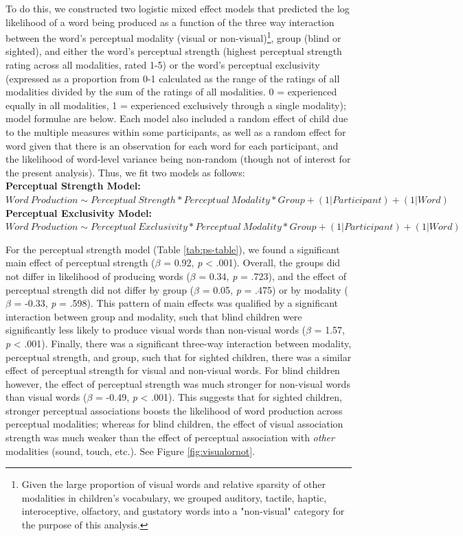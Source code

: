 \documentclass[
  man,floatsintext]{apa6}
\begin{document}
To do this, we constructed two logistic mixed effect models that predicted the log likelihood of a word being produced as a function of the three way interaction between the word's perceptual modality (visual or non-visual)\footnote{Given the large proportion of visual words and relative sparsity of other modalities in children's vocabulary, we grouped auditory, tactile, haptic, interoceptive, olfactory, and gustatory words into a "non-visual" category for the purpose of this analysis.}, group (blind or sighted), and either the word's perceptual strength (highest perceptual strength rating across all modalities, rated 1-5) or the word's perceptual exclusivity (expressed as a proportion from 0-1 calculated as the range of the ratings of all modalities divided by the sum of the ratings of all modalities. 0 = experienced equally in all modalities, 1 = experienced exclusively through a single modality); model formulae are below. Each model also included a random effect of child due to the multiple measures within some participants, as well as a random effect for word given that there is an observation for each word for each participant, and the likelihood of word-level variance being non-random (though not of interest for the present analysis). Thus, we fit two models as follows:\\
\textbf{Perceptual Strength Model:} \(Word\ Production \sim Perceptual\ Strength * Perceptual\ Modality * Group + (1|Participant) + (1|Word)\)\\
\textbf{Perceptual Exclusivity Model:} \(Word\ Production \sim Perceptual\ Exclusivity * Perceptual\ Modality * Group + (1|Participant) + (1|Word)\)

For the perceptual strength model (Table \ref{tab:ps-table}), we found a significant main effect of perceptual strength (\(\beta\) = 0.92, \emph{p} \textless{} .001). Overall, the groups did not differ in likelihood of producing words (\(\beta\) = 0.34, \emph{p} = .723), and the effect of perceptual strength did not differ by group (\(\beta\) = 0.05, \emph{p} = .475) or by modality (\(\beta\) = -0.33, \emph{p} = .598). This pattern of main effects was qualified by a significant interaction between group and modality, such that blind children were significantly less likely to produce visual words than non-visual words (\(\beta\) = 1.57, \emph{p} \textless{} .001). Finally, there was a significant three-way interaction between modality, perceptual strength, and group, such that for sighted children, there was a similar effect of perceptual strength for visual and non-visual words. For blind children however, the effect of perceptual strength was much stronger for non-visual words than visual words (\(\beta\) = -0.49, \emph{p} \textless{} .001). This suggests that for sighted children, stronger perceptual associations boosts the likelihood of word production across perceptual modalities; whereas for blind children, the effect of visual association strength was much weaker than the effect of perceptual association with \emph{other} modalities (sound, touch, etc.). See Figure \ref{fig:visualornot}.
\end{document}
